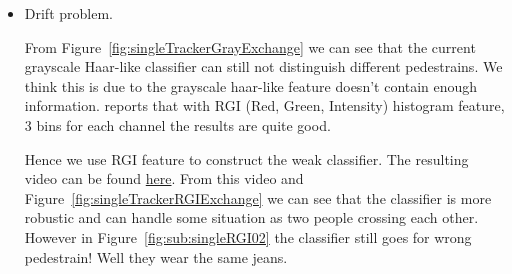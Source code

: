 \documentclass[a4paper]{article}
\begin{document}
\begin{enumerate}
\begin{itemize}
We can see that the classifier works quite good in Figure~\ref{fig:particlesConfidence}. After observation, the particles are drawn with their confidence. The brighter the particle is, the more confidence it has. Notice that the particle is at the upper-left corner of the target.

\begin{figure}[htb]
    \begin{center}
    \end{center}
    \caption{Particles Confidence}
    \label{fig:particlesConfidence}
\end{figure}

\item Drift problem.

From Figure~\ref{fig:singleTrackerGrayExchange} we can see that the current grayscale Haar-like classifier can still not distinguish different pedestrains. We think this is due to the grayscale haar-like feature doesn't contain enough information. \cite{eth_biwi_00633} reports that with RGI (Red, Green, Intensity) histogram feature, 3 bins for each channel the results are quite good. 

Hence we use RGI feature to construct the weak classifier. The resulting video can be found \href{https://zerowong.github.io/PedestrainCounting/results/singleTrackerTestRGI01.avi}{here}. From this video and Figure~\ref{fig:singleTrackerRGIExchange} we can see that the classifier is more robustic and can handle some situation as two people crossing each other. However in Figure~\ref{fig:sub:singleRGI02} the classifier still goes for wrong pedestrain! Well they wear the same jeans.


\end{itemize}
\end{enumerate}
\end{document}
